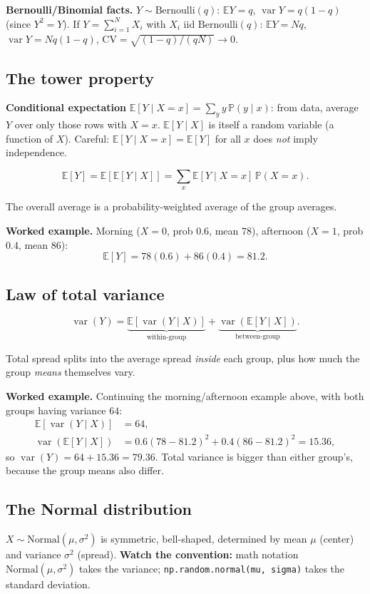 \documentclass[11pt]{article}
\newcommand{\E}{\mathbb{E}}
\newcommand{\Var}{\operatorname{var}}
\renewcommand{\P}{\mathbb{P}}
\newcommand{\given}{\mid}
\newcommand{\Bern}{\text{Bernoulli}}
\newcommand{\Norm}{\text{Normal}}
\newcommand{\py}[1]{\texttt{#1}}
\begin{document}
\textbf{Bernoulli/Binomial facts.} $Y\sim\Bern(q)$: $\E Y=q$, $\Var Y=q(1-q)$ (since $Y^2=Y$). If $Y=\sum_{i=1}^N X_i$ with $X_i$ iid $\Bern(q)$:
$\E Y=Nq$, $\Var Y=Nq(1-q)$, $\mathrm{CV}=\sqrt{(1-q)/(qN)}\to0$.

\subsection{The tower property}
\textbf{Conditional expectation} $\E[Y\given X=x]=\sum_y y\,\P(y\given x)$: from data, average $Y$ over only those rows with $X=x$.
$\E[Y\given X]$ is itself a random variable (a function of $X$). Careful: $\E[Y\given X=x]=\E[Y]$ for all $x$ does \emph{not} imply independence.

\begin{keybox}[title={Tower property}]
\[
\E[Y]=\E[\E[Y\given X]]=\sum_x \E[Y\given X=x]\,\P(X=x).
\]
\end{keybox}
The overall average is a probability-weighted average of the group averages.

\textbf{Worked example.} Morning ($X{=}0$, prob $0.6$, mean $78$), afternoon ($X{=}1$, prob $0.4$, mean $86$):
\[
\E[Y]=78(0.6)+86(0.4)=81.2.
\]

\subsection{Law of total variance}
\begin{keybox}[title={Law of total variance}]
\[
\Var(Y)=\underbrace{\E[\Var(Y\given X)]}_{\text{within-group}}+\underbrace{\Var(\E[Y\given X])}_{\text{between-group}}.
\]
\end{keybox}
Total spread splits into the average spread \emph{inside} each group, plus how much the group \emph{means} themselves vary.

\textbf{Worked example.} Continuing the morning/afternoon example above, with both groups having variance $64$:
\begin{align*}
\E[\Var(Y\given X)]&=64,\\
\Var(\E[Y\given X])&=0.6(78-81.2)^2+0.4(86-81.2)^2=15.36,
\end{align*}
so $\Var(Y)=64+15.36=79.36$. Total variance is bigger than either group's, because the group means also differ.

\subsection{The Normal distribution}
$X\sim\Norm(\mu,\sigma^2)$ is symmetric, bell-shaped, determined by mean $\mu$ (center) and variance $\sigma^2$ (spread). \textbf{Watch the convention:}
math notation $\Norm(\mu,\sigma^2)$ takes the variance; \py{np.random.normal(mu, sigma)} takes the standard deviation.
\end{document}
